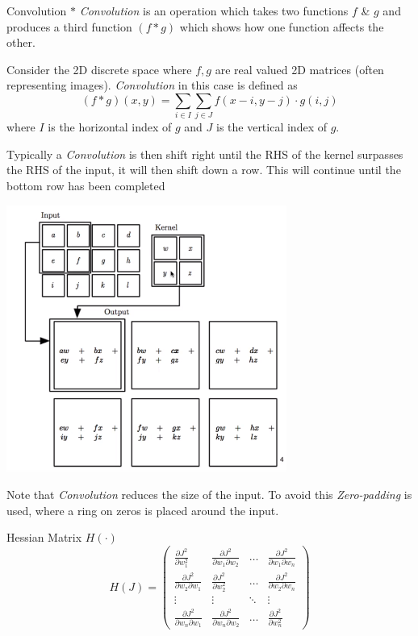 \documentclass[11pt,a4paper]{article}
\begin{document}

  \begin{definition}{Convolution $*$}
    \textit{Convolution} is an operation which takes two functions $f$ \& $g$ and produces a third function $(f*g)$ which shows how one function affects the other.
    \par Consider the 2D discrete space where $f,g$ are real valued 2D matrices (often representing images). \textit{Convolution} in this case is defined as
    \[ (f*g)(x,y)=\sum_{i\in I}\sum_{j\in J}f(x-i,y-j)\cdot g(i,j) \]
    where $I$ is the horizontal index of $g$ and $J$ is the vertical index of $g$.
    \par Typically a \textit{Convolution} is then shift right until the RHS of the kernel surpasses the RHS of the input, it will then shift down a row. This will continue until the bottom row has been completed
    \begin{center}
      \includegraphics[width=.35\textwidth]{2dConvolution.PNG}
    \end{center}
    Note that \textit{Convolution} reduces the size of the input. To avoid this \textit{Zero-padding} is used, where a ring on zeros is placed around the input.
  \end{definition}

  \begin{definition}{Hessian Matrix $H(\cdot)$}
    \[ H(J)=\begin{pmatrix}\frac{\partial J^2}{\partial w_1^2}&\frac{\partial J^2}{\partial w_1\partial w_2}&\dots&\frac{\partial J^2}{\partial w_1\partial w_n}\\\frac{\partial J^2}{\partial w_2\partial w_1}&\frac{\partial J^2}{\partial w_2^2}&\dots&\frac{\partial J^2}{\partial w_2\partial w_n}\\\vdots&\vdots&\ddots&\vdots\\\frac{\partial J^2}{\partial w_n\partial w_1}&\frac{\partial J^2}{\partial w_n\partial w_2}&\dots&\frac{\partial J^2}{\partial w_n^2}\end{pmatrix}\]
  \end{definition}
\end{document}
